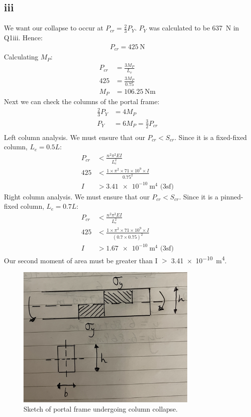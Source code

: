 \documentclass[11pt]{article}
\numberwithin{equation}{section}
\begin{document}
\subsection{iii}
We want our collapse to occur at $P_{cr} = \frac{2}{3}P_Y$. $P_Y$ was calculated to be \SI{637}{\newton} in Q1iii. Hence:
\begin{align}
    P_{cr} = \SI{425}{\newton}
\end{align}
Calculating $M_P$:
\begin{align}
    P_{cr} &= \frac{3M_P}{L_v}\\
    425 &= \frac{3M_P}{0.75}\\
    M_P &= \SI{106.25}{\newton\meter}
\end{align}
Next we can check the columns of the portal frame:
\begin{align}
    \frac{2}{3}P_Y &= 4M_P\\
    P_Y &= 6M_P = \frac{3}{2}P_{cr}\\
\end{align}
Left column analysis. We must ensure that our $P_{cr} < S_{cr}$. Since it is a fixed-fixed column, $L_e = 0.5L$:
\begin{align}
    P_{cr} &< \frac{n^2 \pi^2 E I}{L_e^2}\\
    425 &< \frac{1 \times \pi^2 \times 71 \times 10^9 \times I}{0.75^2}\\
    I &> \SI{3.41e-10}{\meter\tothe{4}} \textrm{ (3sf)}
\end{align}
Right column analysis. We must ensure that our $P_{cr} < S_{cr}$. Since it is a pinned-fixed column, $L_e = 0.7L$:
\begin{align}
    P_{cr} &< \frac{n^2 \pi^2 E I}{L_e^2}\\
    425 &< \frac{1 \times \pi^2 \times 71 \times 10^9 \times I}{(0.7\times 0.75)^2}\\
    I &> \SI{1.67e-10}{\meter\tothe{4}} \textrm{ (3sf)}
\end{align}
Our second moment of area must be greater than I $>$ \SI{3.41e-10}{\meter\tothe{4}}.
\begin{figure}[H]
    \centering
    \includegraphics[height = 7cm]{./img/q3iii1.jpg}
    \caption{Sketch of portal frame undergoing column collapse.}
\end{figure}
\end{document}
